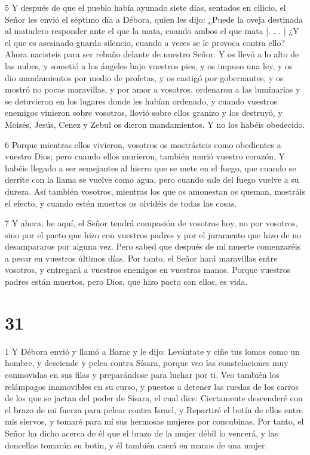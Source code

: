 \par 5 Y después de que el pueblo había ayunado siete días, sentados en cilicio, el Señor les envió el séptimo día a Débora, quien les dijo: ¿Puede la oveja destinada al matadero responder ante el que la mata, cuando ambos el que mata [. . . ] ¿Y el que es asesinado guarda silencio, cuando a veces se le provoca contra ello? Ahora nacisteis para ser rebaño delante de nuestro Señor. Y os llevó a lo alto de las nubes, y sometió a los ángeles bajo vuestros pies, y os impuso una ley, y os dio mandamientos por medio de profetas, y os castigó por gobernantes, y os mostró no pocas maravillas, y por amor a vosotros. ordenaron a las luminarias y se detuvieron en los lugares donde les habían ordenado, y cuando vuestros enemigos vinieron sobre vosotros, llovió sobre ellos granizo y los destruyó, y Moisés, Jesús, Cenez y Zebul os dieron mandamientos. Y no los habéis obedecido.

\par 6 Porque mientras ellos vivieron, vosotros os mostrásteis como obedientes a vuestro Dios; pero cuando ellos murieron, también murió vuestro corazón. Y habéis llegado a ser semejantes al hierro que se mete en el fuego, que cuando se derrite con la llama se vuelve como agua, pero cuando sale del fuego vuelve a su dureza. Así también vosotros, mientras los que os amonestan os queman, mostráis el efecto, y cuando estén muertos os olvidéis de todas las cosas.

\par 7 Y ahora, he aquí, el Señor tendrá compasión de vosotros hoy, no por vosotros, sino por el pacto que hizo con vuestros padres y por el juramento que hizo de no desampararos por alguna vez. Pero sabed que después de mi muerte comenzaréis a pecar en vuestros últimos días. Por tanto, el Señor hará maravillas entre vosotros, y entregará a vuestros enemigos en vuestras manos. Porque vuestros padres están muertos, pero Dios, que hizo pacto con ellos, es vida.

\chapter{31}

\par 1 Y Débora envió y llamó a Barac y le dijo: Levántate y ciñe tus lomos como un hombre, y desciende y pelea contra Sísara, porque veo las constelaciones muy conmovidas en sus filas y preparándose para luchar por ti. Veo también los relámpagos inamovibles en su curso, y puestos a detener las ruedas de los carros de los que se jactan del poder de Sísara, el cual dice: Ciertamente descenderé con el brazo de mi fuerza para pelear contra Israel, y Repartiré el botín de ellos entre mis siervos, y tomaré para mí sus hermosas mujeres por concubinas. Por tanto, el Señor ha dicho acerca de él que el brazo de la mujer débil lo vencerá, y las doncellas tomarán su botín, y él también caerá en manos de una mujer.

